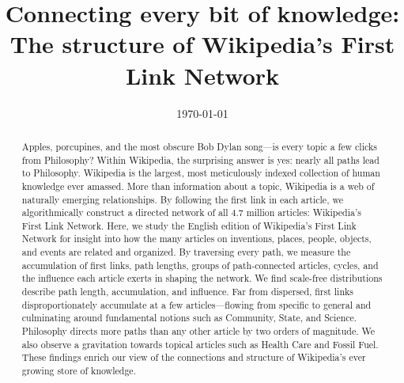 \documentclass[pre,twocolumn,twoside,superscriptaddress,floatfix]{revtex4-1}
\begin{document}
\title{\protect
Connecting every bit of knowledge: \\
The structure of Wikipedia's First Link Network
}

\author{
}


\author{
}


\author{
}



\date{\today}

\begin{abstract}
  \protect
  Apples, porcupines, and the most obscure Bob Dylan song---is every topic a few clicks from Philosophy? 
Within Wikipedia, the surprising answer is yes: nearly all 
paths lead to Philosophy.
Wikipedia is the largest, most meticulously indexed collection of human knowledge ever amassed. 
More than information about a topic, Wikipedia is a web of naturally emerging relationships.  
By following the first link in each article, we algorithmically construct a directed network of 
all 4.7 million articles: Wikipedia's First Link Network.
Here, we study the English edition of Wikipedia's First Link Network for insight into how the many 
articles on inventions, places, people, objects, and events are related and organized.  
By traversing every path, we measure the accumulation of first links, path lengths,
groups of path-connected articles, cycles,
and the influence each article exerts in shaping the network.
We find scale-free distributions describe path length, 
accumulation, and influence. Far from dispersed, first links disproportionately accumulate 
at a few articles---flowing from specific to general and culminating around fundamental notions such as
Community, State, and Science. 
Philosophy directs more paths than any other article by two orders of magnitude. 
We also observe a gravitation towards topical articles such as 
Health Care and Fossil Fuel. 
These findings enrich our view of the connections and structure of
Wikipedia's ever growing store of knowledge.

 
\end{abstract}
\end{document}

